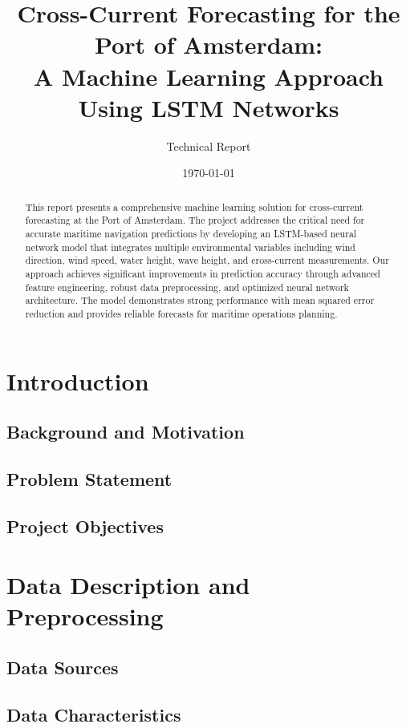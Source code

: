 \documentclass[12pt,a4paper]{article}
\title{Cross-Current Forecasting for the Port of Amsterdam: \\
A Machine Learning Approach Using LSTM Networks}
\author{Technical Report}
\date{\today}
\begin{document}
\maketitle

\begin{abstract}
This report presents a comprehensive machine learning solution for cross-current forecasting at the Port of Amsterdam. The project addresses the critical need for accurate maritime navigation predictions by developing an LSTM-based neural network model that integrates multiple environmental variables including wind direction, wind speed, water height, wave height, and cross-current measurements. Our approach achieves significant improvements in prediction accuracy through advanced feature engineering, robust data preprocessing, and optimized neural network architecture. The model demonstrates strong performance with mean squared error reduction and provides reliable forecasts for maritime operations planning.
\end{abstract}

\tableofcontents
\newpage

\section{Introduction}

\subsection{Background and Motivation}

\subsection{Problem Statement}

\subsection{Project Objectives}

\section{Data Description and Preprocessing}

\subsection{Data Sources}

\subsection{Data Characteristics}
\end{document}

